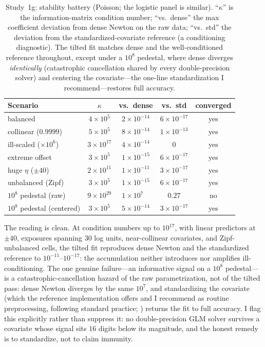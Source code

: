 \documentclass[11pt]{article}
\begin{document}
\begin{table}[t]
\centering
\caption{Study~1g: stability battery (Poisson; the logistic panel is
similar).  ``$\kappa$'' is the information-matrix condition number;
``vs.\ dense'' the max coefficient deviation from dense Newton on the raw
data; ``vs.\ std'' the deviation from the standardized-covariate
reference (a conditioning diagnostic).  The tilted fit matches dense and
the well-conditioned reference throughout, except under a $10^8$
pedestal, where dense diverges \emph{identically} (catastrophic
cancellation shared by every double-precision solver) and centering the
covariate---the one-line standardization I recommend---restores
full accuracy.}
\label{tab:stability}
\small
\begin{tabular}{lccc c}
\toprule
Scenario & $\kappa$ & vs.\ dense & vs.\ std & converged \\
\midrule
balanced                 & $4\times10^{5}$  & $2\times10^{-14}$ & $6\times10^{-17}$ & yes \\
collinear ($0.9999$)     & $5\times10^{5}$  & $8\times10^{-14}$ & $1\times10^{-13}$ & yes \\
ill-scaled ($\times10^6$)& $3\times10^{17}$ & $4\times10^{-14}$ & $0$               & yes \\
extreme offset           & $3\times10^{5}$  & $1\times10^{-15}$ & $6\times10^{-17}$ & yes \\
huge $\eta$ ($\pm40$)    & $2\times10^{11}$ & $1\times10^{-11}$ & $3\times10^{-17}$ & yes \\
unbalanced (Zipf)        & $3\times10^{5}$  & $1\times10^{-15}$ & $6\times10^{-17}$ & yes \\
$10^8$ pedestal (raw)    & $9\times10^{29}$ & $1\times10^{7\phantom{-}}$ & $0.27$ & no  \\
$10^8$ pedestal (centered)& $3\times10^{5}$ & $5\times10^{-14}$ & $3\times10^{-17}$ & yes \\
\bottomrule
\end{tabular}
\end{table}

The reading is clean.  At condition numbers up to $10^{17}$, with linear
predictors at $\pm 40$, exposures spanning $30$ log units, near-collinear
covariates, and Zipf-unbalanced cells, the tilted fit reproduces dense
Newton and the standardized reference to $10^{-11}$--$10^{-17}$: the
accumulation neither introduces nor amplifies ill-conditioning.  The one
genuine failure---an informative signal on a $10^8$ pedestal---is a
catastrophic-cancellation hazard of the raw parametrization, not of the
tilted pass: dense Newton diverges by the same $10^7$, and standardizing
the covariate (which the reference implementation offers and I
recommend as routine preprocessing, following standard practice;
\citealp{higham2002}) returns the fit to full accuracy.  I flag this
explicitly rather than suppress it: no double-precision GLM solver
survives a covariate whose signal sits $16$ digits below its magnitude,
and the honest remedy is to standardize, not to claim immunity.
\end{document}
